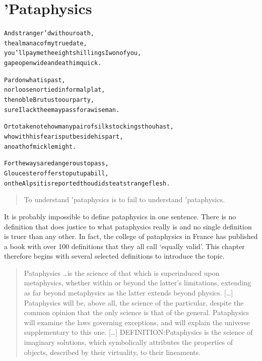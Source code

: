 
\chapter[Pataphysics]{'Pataphysics}
\label{ch:pataphysics}

\startcontents[chapters]

\vfill

\begin{alltt}\sffamily
And stranger'd with our oath,
the almanac of my true date,
you'll pay me the eight shillings I won of you,
gape open wide and eat him quick.

Pardon what is past,
nor loose nor tied in formal plat, 
the noble Brutus to our party,
sure I lack thee may pass for a wise man.

Or to take note how many pair of silk stockings thou hast,
who with his fear is put beside his part,
an oath of mickle might.

For the ways are dangerous to pass,  
Gloucester offers to put up a bill,
on the Alps it is reported thou didst eat strange flesh.
\end{alltt}

\newpage
\minicontents
\spirals


\label{s:definitions}

\begin{quotation}
  To understand $'$pataphysics is to fail to understand $'$pataphysics. 
\end{quotation}

It is probably impossible to define pataphysics in one sentence. There is no definition that does justice to what pataphysics really is and no single definition is truer than any other. In fact, the college of pataphysics in France has published a book \autocite{Brotchie2003} with over 100 definitions that they all call `equally valid'. This chapter therefore begins with several selected definitions to introduce the topic.

\begin{quotation}
  Pataphysics \ldots is the science of that which is superinduced upon metaphysics, whether within or beyond the latter's limitations, extending as far beyond metaphysics as the latter extends beyond physics. [\ldots] Pataphysics will be, above all, the science of the particular, despite the common opinion that the only science is that of the general. Pataphysics will examine the laws governing exceptions, and will explain the universe supplementary to this one. [\ldots] DEFINITION:\@ Pataphysics is the science of imaginary solutions, which symbolically attributes the properties of objects, described by their virtuality, to their lineaments. 
\end{quotation}

